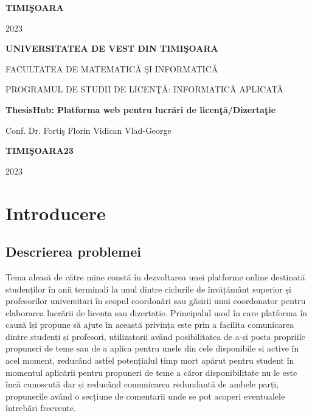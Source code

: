 \documentclass[12pt,a4paper,hidelinks]{report}
\theoremstyle{definition}
\theoremstyle{remark}
\begin{document}
\vfill
\begin{center}
{\bf TIMI\c SOARA

2023}
\end{center}
\newpage
\thispagestyle{empty}
\begin{center}
{\large{\bf UNIVERSITATEA DE VEST DIN TIMI\c SOARA

FACULTATEA DE MATEMATIC\u A \c SI INFORMATIC\u A

PROGRAMUL DE STUDII DE LICEN\c T\u A: INFORMATIC\u A APLICAT\u A}}

\vspace{120pt}
{\huge {\bf ThesisHub: Platforma web pentru lucr\u ari de licen\c t\u a/Dizerta\c tie}}

\vspace{150pt}
\end{center}

{\large{}

\noindent Conf. Dr. Forti\c s Florin \hfill Vidican Vlad-George}

\vfill
\begin{center}
{\bf TIMI\c SOARA23

2023}
\end{center}
\newpage
\normalsize{}
\tableofcontents
\newpage
\chapter{Introducere}

\section{Descrierea problemei}
Tema aleasă de către mine constă în dezvoltarea unei platforme online destinată studenților în anii terminali la unul dintre ciclurile de învățământ superior și profesorilor universitari în scopul coordonări sau găsirii unui coordonator pentru elaborarea lucrării de licența sau dizertație. Principalul mod în care platforma în cauză își propune să ajute în această privința este prin a facilita comunicarea dintre studenți și profesori, utilizatorii având posibilitatea de a-și posta propriile propuneri de teme sau de a aplica pentru unele din cele disponibile si active în acel moment, reducând astfel potențialul timp mort apărut pentru student în momentul aplicării pentru propuneri de teme a căror disponibilitate nu le este încă cunoscută dar și reducând comunicarea redundantă de ambele parți, propunerile având o secțiune de comentarii unde se pot acoperi eventualele întrebări frecvente.
\end{document}
